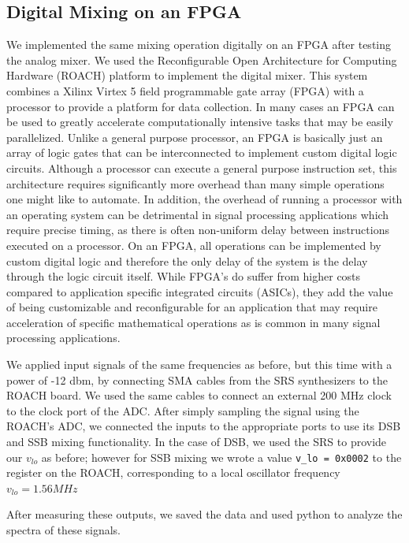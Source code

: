 \documentclass{article}
\begin{document}
  \subsection{Digital Mixing on an FPGA}
  We implemented the same mixing operation digitally on an FPGA after testing the analog mixer. We used the Reconfigurable Open Architecture for Computing Hardware (ROACH) platform to implement the digital mixer.  This system combines a Xilinx Virtex 5 field programmable gate array (FPGA) with a processor to provide a platform for data collection. In many cases an FPGA can be used to greatly accelerate computationally intensive tasks that may be easily parallelized. Unlike a general purpose processor, an FPGA is basically just an array of logic gates that can be interconnected to implement custom digital logic circuits. Although a processor can execute a general purpose instruction set, this architecture requires significantly more overhead than many simple operations one might like to automate. In addition, the overhead of running a processor with an operating system can be detrimental in signal processing applications which require precise timing, as there is often non-uniform delay between instructions executed on a processor. On an FPGA, all operations can be implemented by custom digital logic and therefore the only delay of the system is the delay through the logic circuit itself. While FPGA's do suffer from higher costs compared to application specific integrated circuits (ASICs), they add the value of being customizable and reconfigurable for an application that may require acceleration of specific mathematical operations as is common in many signal processing applications.
  

  We applied input signals of the same frequencies as before, but this time with a power of -12 dbm, by connecting SMA cables from the SRS synthesizers to the ROACH board.  We used the same cables to connect an external 200 MHz clock to the clock port of the ADC.  After simply sampling the signal using the ROACH's ADC, we connected the inputs to the appropriate ports to use its DSB and SSB mixing functionality. In the case of DSB, we used the SRS to provide our $v_{lo}$ as before; however for SSB mixing we wrote a value \lstinline{v_lo = 0x0002} to the register on the ROACH, corresponding to a local oscillator frequency $v_{lo} = 1.56 MHz$ 
  
After measuring these outputs, we saved the data and used python to analyze the spectra of these signals. 
\end{document}

